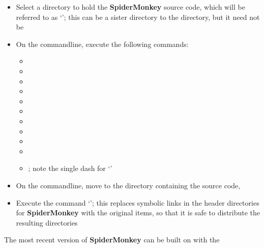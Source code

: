 \begin{itemize}
\item Select a directory to hold the \textbf{SpiderMonkey} source code, which will be
referred to as `'; this can be a sister directory to the
 directory, but it need not be
\item\exSp{}On the command\longDash{}line, execute the following commands:
\begin{itemize}
\item{}
\item\exSp{}
\item\exSp{}
\item\exSp{}
\item\exSp{}
\item\exSp{}
\item\exSp{}
\item\exSp{}
\item\exSp{}
\item\exSp{}
\item\exSp{}; note
the single dash for `'
\end{itemize}
\item\exSp{}On the command\longDash{}line, move to the directory containing the \mplusm{}
source code, 
\item\exSp{}Execute the command `'; this replaces symbolic links in the
header directories for \textbf{SpiderMonkey} with the original items, so that it is safe
to distribute the resulting directories
\end{itemize}
\tertiaryEnd
{}
The most recent version of \textbf{SpiderMonkey} can be built on \win{} with the
